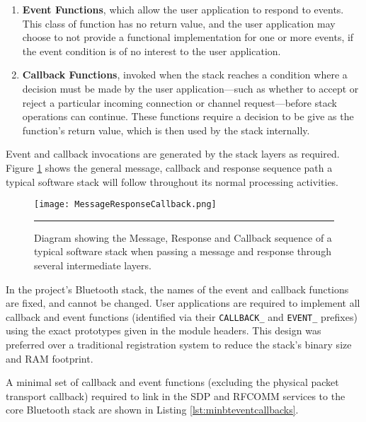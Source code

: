 \begin{enumerate}
	\item \textbf{Event Functions}, which allow the user application to respond to events. This class of function has no return value, and the user application may choose to not provide a functional implementation for one or more events, if the event condition is of no interest to the user application.
	\item \textbf{Callback Functions}, invoked when the stack reaches a condition where a decision must be made by the user application---such as whether to accept or reject a particular incoming connection or channel request---before stack operations can continue. These functions require a decision to be give as the function's return value, which is then used by the stack internally.
\end{enumerate}

Event and callback invocations are generated by the stack layers as required. Figure \ref{fig:messageresponsecallback} shows the general message, callback and response sequence path a typical software stack will follow throughout its normal processing activities.

\begin{figure}[tbph]
	\vspace{1em}
	\centering
		\texttt{[image: MessageResponseCallback.png]}
	\rule{35em}{0.5pt}
	\caption[Diagram of the Message, Response and Callback sequence]{Diagram showing the Message, Response and Callback sequence of a typical software stack when passing a message and response through several intermediate layers.}
	\label{fig:messageresponsecallback}
\end{figure}

In the project's Bluetooth stack, the names of the event and callback functions are fixed, and cannot be changed. User applications are required to implement all callback and event functions (identified via their \lstinline{CALLBACK_} and \lstinline{EVENT_} prefixes) using the exact prototypes given in the module headers. This design was preferred over a traditional registration system to reduce the stack's binary size and RAM footprint.

A minimal set of callback and event functions (excluding the physical packet transport callback) required to link in the SDP and RFCOMM services to the core Bluetooth stack are shown in Listing \ref{lst:minbteventcallbacks}.


